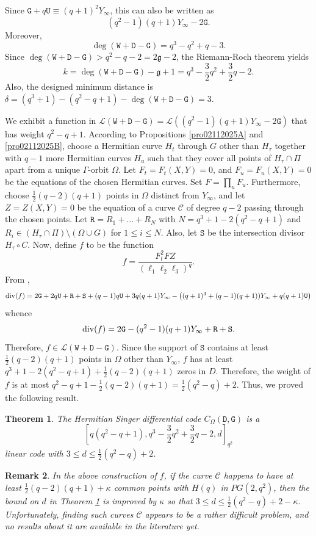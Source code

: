 \documentclass[9pt]{article}
\theoremstyle{plain}
\newtheorem{thm}{Theorem}[section]
\newtheorem{rem}[thm]{Remark}
\begin{document}
Since $\mathtt{G}+q\mathtt{U}\equiv (q+1)^2Y_\infty$, this can also be written as
$$(q^2-1)(q+1)Y_\infty-2 \mathtt{G}.$$
Moreover, $$\deg({\mathtt{W}}+{\mathtt{D}}-{\mathtt{G}})=q^3-q^2+q-3.$$ Since $\deg(\mathtt W+\mathtt D-\mathtt G)>q^2-q-2=2\mathfrak{g}-2$, the Riemann-Roch theorem yields $$k=\deg(\mathtt W+\mathtt D-\mathtt G)-\mathfrak{g}+1=q^3-\textstyle{\frac{3}{2}}q^2+\frac{3}{2}q-2.$$
Also, the designed minimum distance is $\delta=(q^3+1)-(q^2-q+1)-\deg(\mathtt W+\mathtt D-\mathtt G)=3$.

We exhibit a function in $\mathcal{L}(\mathtt{W}+\mathtt{D}-\mathtt{G})=\mathcal{L}((q^2-1)(q+1)Y_\infty-2\mathtt{G})$
that has weight $q^2-q+1$. According to Propositions \ref{pro02112025A} and \ref{pro02112025B}, choose a Hermitian curve $H_t$ through $G$ other than $H_\tau$ together with $q-1$ more Hermitian curves $H_u$ such that they cover all points of $H_\tau\cap \Pi$ apart from a unique $\Gamma$-orbit $\Omega$. Let $F_t=F_t(X,Y)=0$, and $F_u=F_u(X,Y)=0$ be the equations of the chosen Hermitian curves. Set $F=\prod_u F_u$. Furthermore, choose  $\frac{1}{2}(q-2)(q+1)$ points in $\Omega$ distinct from $Y_\infty$, and let $Z=Z(X,Y)=0$ be the equation of a curve $\mathcal{C}$ of degree $q-2$ passing through the chosen points.  
 Let $\mathtt{R}=R_1+\ldots+ R_N$ with $N=q^3+1-2(q^2-q+1)$ and $R_i\in (H_\tau\cap\Pi)\setminus (\Omega\cup G)$ for $1\le i\le N$. Also, let $\mathtt{S}$ be the intersection divisor $H_\tau\circ C$. Now, define $f$ to be the function    
$$f=\frac{F_t^2FZ}{(\ell_1\ell_2\ell_3)^q}.$$
From \cite[Theorem 6.42]{HKT},  
$${\rm{div}}(f)=2\mathtt{G}+2q\mathtt{U}+\mathtt{R}+\mathtt{S}+(q-1)q\mathtt{U}+3q(q+1)Y_\infty-
\big((q+1)^3+(q-1)(q+1))Y_\infty+q(q+1)\mathtt{U}\big)$$
whence
$${\rm{div}}(f)=2\mathtt{G}-(q^2-1)(q+1)Y_\infty+\mathtt{R}+\mathtt{S}.$$ %
Therefore, $f\in \mathcal{L}({\mathtt{W}}+{\mathtt{D}}-{\mathtt{G}})$. 
Since the support of $\mathtt{S}$ contains at least $\frac{1}{2}(q-2)(q+1)$ points in $\Omega$ other than $Y_\infty$, $f$ has at least $q^3+1-2(q^2-q+1)+\frac{1}{2}(q-2)(q+1)$ zeros in $D$. Therefore, the weight of $f$ is at most $q^2-q+1-\frac{1}{2}(q-2)(q+1)=\frac{1}{2}(q^2-q)+2$. Thus, we proved the following result.
\begin{thm} 
\label{thm13112025}
    The Hermitian Singer differential code $C_{\Omega}(\mathtt D,\mathtt G)$ is a 
    $$[q(q^2-q+1),q^3-\frac{3}{2}q^2+\frac{3}{2}q-2,d]_{q^2}$$ linear code with $3\le d\leq \frac{1}{2}(q^2-q)+2$.
\end{thm}
\begin{rem}
\label{rem16112025} \rm{In the above construction of $f$, if the curve $\mathcal{C}$ happens to have at least $\frac{1}{2}(q-2)(q+1)+\kappa$ common points with $H(q)$ in $PG(2,q^2)$, then the bound on $d$ in Theorem \ref{thm13112025} is improved by $\kappa$ so that $3\le d \le \frac{1}{2}(q^2-q)+2-\kappa$. Unfortunately, finding such curves $\mathcal{C}$ appears to be a rather difficult problem, and no results about it are available in the literature yet.}
\end{rem}
\end{document}
